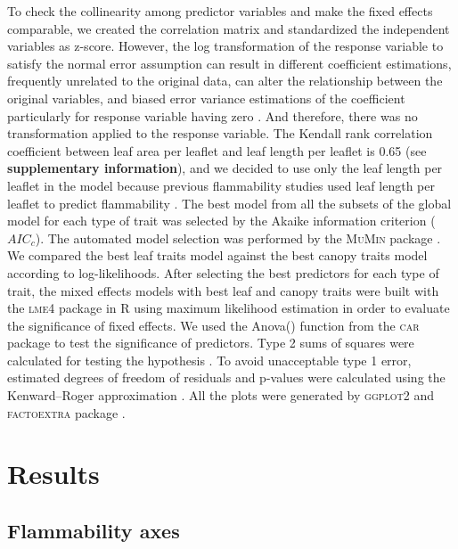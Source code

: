 \documentclass{bmcart}
\newcommand{\pkg}[1]{\textsc{#1}}
\begin{document}
To check the collinearity among predictor variables and make the fixed effects comparable, we created the correlation matrix and standardized the independent variables as z-score. However, the log transformation of the response variable to satisfy the normal error assumption can result in different coefficient estimations, frequently unrelated to the original data, can alter the relationship between the original variables, and biased error variance estimations of the coefficient particularly for response variable having zero \citep{mccuen1990problems,packard2008model,o2010not, changyong2014log, st2018count}. And therefore, there was no transformation applied to the response variable. The Kendall rank correlation coefficient between leaf area per leaflet and leaf length per leaflet is 0.65 (see \textbf{supplementary information}), and we decided to use only the leaf length per leaflet in the model because previous flammability studies used leaf length per leaflet to predict flammability \citep{alam2020shoot}. 
The best model from all the subsets of the global model for each type of trait was selected by the Akaike information criterion ($AIC_{c}$). The automated model selection was performed by the \pkg{MuMin} package \citep{barton2015packagemumin}. We compared the best leaf traits model against the best canopy traits model according to log-likelihoods. After selecting the best predictors for each type of trait, the mixed effects models with best leaf and canopy traits were built with the \pkg{lme4} package in R \citep{bates2009package} using maximum likelihood estimation in order to evaluate the significance of fixed effects. We used the Anova() function from the \pkg{car} package \citep{fox2013hypothesis} to test the significance of predictors. Type  2  sums  of  squares  were  calculated  for testing the hypothesis \citep{langsrud2003anova}. To avoid unacceptable type 1 error, estimated degrees of freedom of residuals and p-values were calculated using the Kenward--Roger approximation \citep{kenward1997small}. All the plots were generated by \pkg{ggplot2} and \pkg{factoextra} package \citep{wickham2016packageggplot2, kassambara2017packagefactoextra}.



\section*{Results}

\subsection*{Flammability axes}
\end{document}
